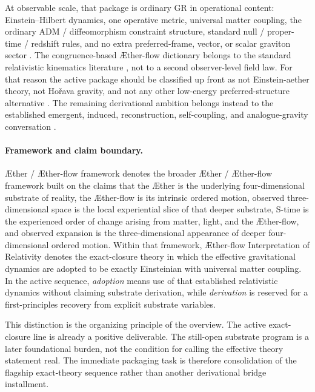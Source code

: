 \documentclass[11pt]{article}
\newcommand{\Aether}{\AE{}ther}
\newcommand{\Aflow}{\AE{}ther-flow}
\newcommand{\TheoryName}{\Aflow{} Interpretation of Relativity}
\newcommand{\TheoryProgram}{\Aether{} / \Aflow{} framework}
\begin{document}
At observable scale, that package is ordinary GR in operational content: Einstein--Hilbert dynamics, one operative metric, universal matter coupling, the ordinary ADM / diffeomorphism constraint structure, standard null / proper-time / redshift rules, and no extra preferred-frame, vector, or scalar graviton sector \cite{Einstein1916,ADM1962}. The congruence-based \Aflow{} dictionary belongs to the standard relativistic kinematics literature \cite{Raychaudhuri1955,EllisVanElst1999}, not to a second observer-level field law. For that reason the active package should be classified up front as not Einstein-aether theory, not Ho\v{r}ava gravity, and not any other low-energy preferred-structure alternative \cite{JacobsonMattingly2001,JacobsonMattingly2004,ElingJacobson2004,Jacobson2010,Jacobson2014,JacobsonSperanza2015,Horava2009}. The remaining derivational ambition belongs instead to the established emergent, induced, reconstruction, self-coupling, and analogue-gravity conversation \cite{Jacobson1995,Visser2002,HojmanKucharTeitelboim1976,Deser2004,Lovelock1971,BarceloLiberatiVisser2011,Sakharov1967}.

\paragraph{Framework and claim boundary.}
\TheoryProgram{} denotes the broader \Aether{} / \Aflow{} framework built on the claims that the \Aether{} is the underlying four-dimensional substrate of reality, the \Aflow{} is its intrinsic ordered motion, observed three-dimensional space is the local experiential slice of that deeper substrate, S-time is the experienced order of change arising from matter, light, and the \Aflow{}, and observed expansion is the three-dimensional appearance of deeper four-dimensional ordered motion. Within that framework, \TheoryName{} denotes the exact-closure theory in which the effective gravitational dynamics are adopted to be exactly Einsteinian with universal matter coupling. In the active sequence, \emph{adoption} means use of that established relativistic dynamics without claiming substrate derivation, while \emph{derivation} is reserved for a first-principles recovery from explicit substrate variables.

This distinction is the organizing principle of the overview. The active exact-closure line is already a positive deliverable. The still-open substrate program is a later foundational burden, not the condition for calling the effective theory statement real. The immediate packaging task is therefore consolidation of the flagship exact-theory sequence rather than another derivational bridge installment.
\end{document}
